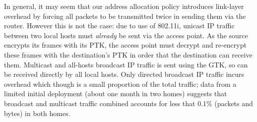 

In general, it may seem that our address allocation policy introduces
link-layer overhead by forcing all packets to be transmitted twice in
sending them via the router.  However this is not the case: due to use
of 802.11i, unicast IP traffic between two local hosts must
\emph{already} be sent via the access point.  As the source encrypts
its frames with its PTK, the access point must decrypt and re-encrypt
these frames with the destination's PTK in order that the destination
can receive them.  Multicast and all-hosts broadcast IP traffic is
sent using the GTK, so can be received directly by all local hosts.
Only directed broadcast IP traffic incurs overhead which though is a
small proportion of the total traffic; data from a limited initial
deployment (about one month in two homes) suggests that broadcast and
multicast traffic combined accounts for less that 0.1\% (packets and
bytes) in both homes.

